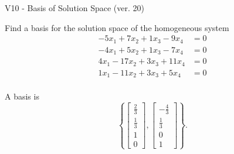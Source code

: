 \begin{exercise}
  \begin{exerciseTitle}V10 - Basis of Solution Space (ver. 20)\end{exerciseTitle}
  \begin{exerciseStatement}
    Find a basis for the solution space of the homogeneous system 
\begin{align*}
 -5 x_ 1 + 7 x_ 2 + 1 x_ 3 -9 x_ 4 &= 0  \\ 
  -4 x_ 1 + 5 x_ 2 + 1 x_ 3 -7 x_ 4 &= 0  \\ 
  4 x_ 1 -17 x_ 2 + 3 x_ 3 + 11 x_ 4 &= 0  \\ 
  1 x_ 1 -11 x_ 2 + 3 x_ 3 + 5 x_ 4 &= 0  \\ 
 \end{align*}


 
  \end{exerciseStatement}

  \begin{exerciseAnswer}
   A basis is   
\[\left\{\left[\begin{array}{c}
\frac{2}{3} \\
\frac{1}{3} \\
1 \\
0
\end{array}\right] , \left[\begin{array}{c}
-\frac{4}{3} \\
\frac{1}{3} \\
0 \\
1
\end{array}\right]\right\}.\]

  


  \end{exerciseAnswer}
\end{exercise}